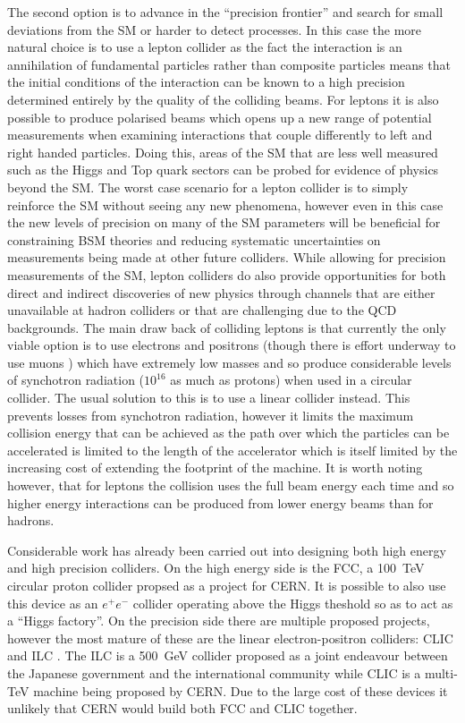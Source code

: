 The second option is to advance in the ``precision frontier'' and search for small deviations from the \ac{SM} or harder to detect processes. In this case the more natural choice is to use a lepton collider as the fact the interaction is an annihilation of fundamental particles rather than composite particles means that the initial conditions of the interaction can be known to a high precision determined entirely by the quality of the colliding beams. For leptons it is also possible to produce polarised beams which opens up a new range of potential measurements when examining interactions that couple differently to left and right handed particles. Doing this, areas of the \ac{SM} that are less well measured such as the Higgs and Top quark sectors can be probed for evidence of physics beyond the \ac{SM}. The worst case scenario for a lepton collider is to simply reinforce the \ac{SM} without seeing any new phenomena, however even in this case the new levels of precision on many of the \ac{SM} parameters will be beneficial for constraining \ac{BSM} theories and reducing systematic uncertainties on measurements being made at other future colliders. While allowing for precision measurements of the \ac{SM}, lepton colliders do also provide opportunities for both direct and indirect discoveries of new physics through channels that are either unavailable at hadron colliders or that are challenging due to the \ac{QCD} backgrounds. The main draw back of colliding leptons is that currently the only viable option is to use electrons and positrons (though there is effort underway to use muons \cite{Bogomilov:2017vwz}) which have extremely low masses and so produce considerable levels of synchotron radiation (${10^{16}}$ as much as protons) when used in a circular collider. The usual solution to this is to use a linear collider instead. This prevents losses from synchotron radiation, however it limits the maximum collision energy that can be achieved as the path over which the particles can be accelerated is limited to the length of the accelerator which is itself limited by the increasing cost of extending the footprint of the machine. It is worth noting however, that for leptons the collision uses the full beam energy each time and so higher energy interactions can be produced from lower energy beams than for hadrons.

Considerable work has already been carried out into designing both high energy and high precision colliders. On the high energy side is the \ac{FCC}, a 100~TeV circular proton collider propsed as a project for \ac{CERN}. It is possible to also use this device as an $e^+e^-$ collider operating above the Higgs theshold so as to act as a ``Higgs factory''. On the precision side there are multiple proposed projects, however the most mature of these are the linear electron-positron colliders: \ac{CLIC} \cite{CLIC:2016zwp} and \ac{ILC} \cite{Behnke:2013xla}. The \ac{ILC} is a 500~GeV collider proposed as a joint endeavour between the Japanese government and the international community while \ac{CLIC} is a multi-TeV machine being proposed by \ac{CERN}. Due to the large cost of these devices it unlikely that \ac{CERN} would build both \ac{FCC} and \ac{CLIC} together.

